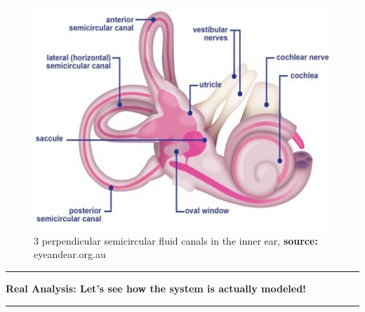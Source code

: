 \documentclass[15.7pt]{article}
\newcommand\question[2]{\vspace{.25in}\hrule\textbf{#1: #2}\vspace{.5em}\hrule\vspace{.10in}}
\begin{document}
\begin{center}
 \begin{figure}[h]
        \centering
        \includegraphics[scale=0.5]{inner-ear.png}
        \caption{3 perpendicular semicircular fluid canals in the inner ear, \textbf{source:} eyeandear.org.au}
    \end{figure}   
\end{center}
\newpage
\question{Real Analysis}{Let's see how the system is actually modeled!}
\end{document}
